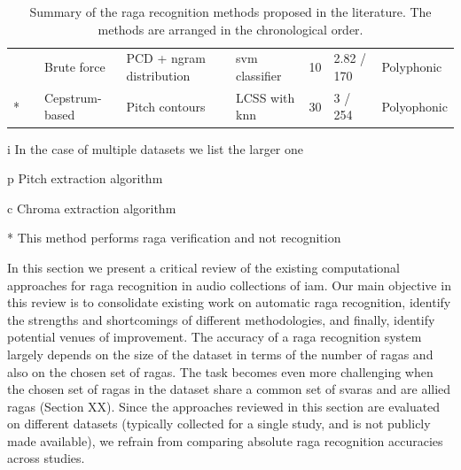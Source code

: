{\begin{table}
\begin{threeparttable}
\begin{centering}
\begin{tabular}{l l P{2cm} P{3cm} P{2.5cm} L{1cm} P{1.5cm} P{2cm}}
				\cite{kumar2014identifying} & \cite{Salamon2012} & Brute force & PCD + \acrshort{ngram} distribution & \acrshort{svm} classifier  & 10 & 2.82 / 170 & Polyphonic\tabularnewline
				\cite{shrey_ISMIR_2015}{*} & \cite{Salamon2012} & Cepstrum-based & Pitch contours & LCSS with \acrshort{knn} & 30 & 3 / 254 & Polyophonic\tabularnewline
				\hline 
			\end{tabular}
			\par \end{centering}
		\begin{tablenotes}
			\item[i] In the case of multiple datasets we list the larger one
			\item[p] Pitch extraction algorithm
			\item[c] Chroma extraction algorithm
			\item[*] This method performs \gls{raga} verification and not recognition
		\end{tablenotes}
		\caption{Summary of the \Gls{raga} recognition methods proposed in the literature. The methods are arranged in the chronological order. }
		\label{tab:raga_recognition_methods_details}
	\end{threeparttable}
\end{table}

In this section we present a critical review of the existing computational approaches for \gls{raga} recognition in audio collections of \gls{iam}. Our main objective in this review is to consolidate existing work on automatic \gls{raga} recognition, identify the strengths and shortcomings of different methodologies, and finally, identify potential venues of improvement. The accuracy of a \gls{raga} recognition system largely depends on the size of the dataset in terms of the number of \glspl{raga} and also on the chosen set of \glspl{raga}. The task becomes even more challenging when the chosen set of \glspl{raga} in the dataset share a common set of \glspl{svara} and are allied \glspl{raga} (Section XX). Since the approaches reviewed in this section are evaluated on different datasets (typically collected for a single study, and is not publicly made available), we refrain from comparing absolute \gls{raga} recognition accuracies across studies. 

}
